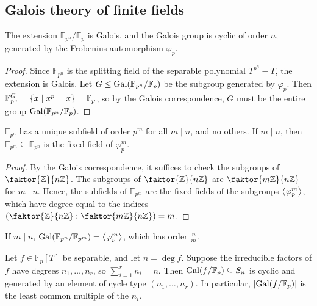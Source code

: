 \subsection{Galois theory of finite fields}
\begin{theorem}
	The extension \( \mathbb F_{p^n} / \mathbb F_p \) is Galois, and the Galois group is cyclic of order \( n \), generated by the Frobenius automorphism \( \varphi_p \).
\end{theorem}
\begin{proof}
	Since \( \mathbb F_{p^n} \) is the splitting field of the separable polynomial \( T^{p^n} - T \), the extension is Galois.
	Let \( G \leq \operatorname{Gal}(\mathbb F_{p^n} / \mathbb F_p) \) be the subgroup generated by \( \varphi_p \).
	Then \( \mathbb F_{p^n}^G = \qty{x \mid x^p = x} = \mathbb F_p \), so by the Galois correspondence, \( G \) must be the entire group \( \operatorname{Gal}(\mathbb F_{p^n} / \mathbb F_p) \).
\end{proof}
\begin{theorem}
	\( \mathbb F_{p^n} \) has a unique subfield of order \( p^m \) for all \( m \mid n \), and no others.
	If \( m \mid n \), then \( \mathbb F_{p^m} \subseteq \mathbb F_{p^n} \) is the fixed field of \( \varphi_p^m \).
\end{theorem}
\begin{proof}
	By the Galois correspondence, it suffices to check the subgroups of \( \faktor{\mathbb Z}{n\mathbb Z} \).
	The subgroups of \( \faktor{\mathbb Z}{n\mathbb Z} \) are \( \faktor{m\mathbb Z}{n\mathbb Z} \) for \( m \mid n \).
	Hence, the subfields of \( \mathbb F_{p^m} \) are the fixed fields of the subgroups \( \left\langle{} \varphi_p^m \right\rangle \), which have degree equal to the indices \( \qty(\faktor{\mathbb Z}{n\mathbb Z} : \faktor{m\mathbb Z}{n\mathbb Z}) = m \).
\end{proof}
\begin{remark}
	If \( m \mid n \), \( \operatorname{Gal}(\mathbb F_{p^n} / \mathbb F_{p^m}) = \left\langle{} \varphi_p^m \right\rangle \), which has order \( \frac{n}{m} \).
\end{remark}
\begin{theorem}
	Let \( f \in \mathbb F_p[T] \) be separable, and let \( n = \deg f \).
	Suppose the irreducible factors of \( f \) have degrees \( n_1, \dots, n_r \), so \( \sum_{i=1}^r n_i = n \).
	Then \( \operatorname{Gal}(f/\mathbb F_p) \subseteq S_n \) is cyclic and generated by an element of cycle type \( (n_1, \dots, n_r) \).
	In particular, \( \abs{\operatorname{Gal}(f/\mathbb F_p)} \) is the least common multiple of the \( n_i \).
\end{theorem}

